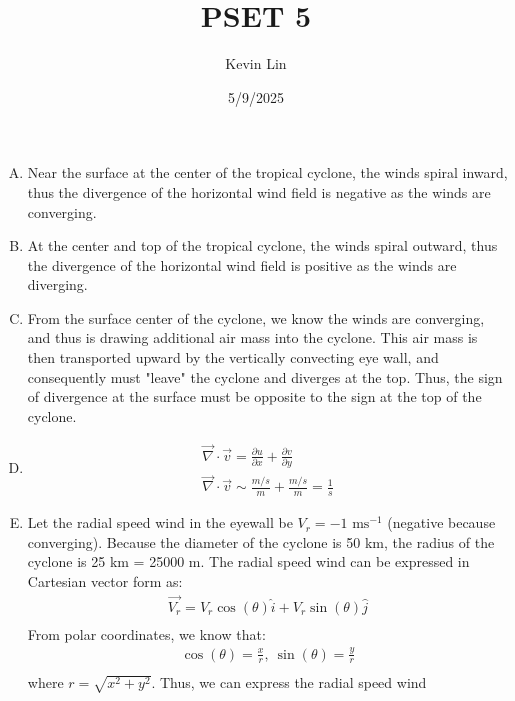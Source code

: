 \documentclass[11pt,a4paper,margin=1in]{article}
\title{PSET 5}
\author{Kevin Lin}
\date{5/9/2025}
\begin{document}
\maketitle
\section{}
\begin{enumerate}[A.]
    \item 
    Near the surface at the center of the tropical cyclone, the winds spiral 
    inward, thus the divergence of the horizontal wind field is negative as the 
    winds are converging.
    \item 
    At the center and top of the tropical cyclone, the winds spiral outward,
    thus the divergence of the horizontal wind field is positive as the winds are
    diverging.
    \item 
    From the surface center of the cyclone, we know the winds are converging, and
    thus is drawing additional air mass into the cyclone. This air mass is then
    transported upward by the vertically convecting eye wall, and consequently must
    "leave" the cyclone and diverges at the top. Thus, the sign of divergence at
    the surface must be opposite to the sign at the top of the cyclone.
    \item 
    \begin{gather*}
        \vec{\nabla} \cdot \vec{v} = \frac{\partial u}{\partial x} + 
            \frac{\partial v}{\partial y} \\
        \vec{\nabla} \cdot \vec{v} \sim \frac{m/s}{m} + \frac{m/s}{m} = \frac{1}{s}
    \end{gather*}
    \item 
    Let the radial speed wind in the eyewall be $V_r = -1 \text{ ms}^{-1}$
    (negative because converging). Because the diameter of the cyclone is 50 km, 
    the radius of the cyclone is  25 km = 25000 m. The radial speed wind can be 
    expressed in Cartesian vector form as:
    \begin{gather*}
        \vec{V_r} = V_r \cos(\theta) \hat{i} + V_r \sin(\theta) \hat{j} \\
    \end{gather*}
    From polar coordinates, we know that:
    \begin{gather*}
        \cos(\theta) = \frac{x}{r}, \  \sin(\theta) = \frac{y}{r} \\
    \end{gather*}
    where $r = \sqrt{x^2 + y^2}$. Thus, we can express the radial speed wind

\end{enumerate}
\end{document}
